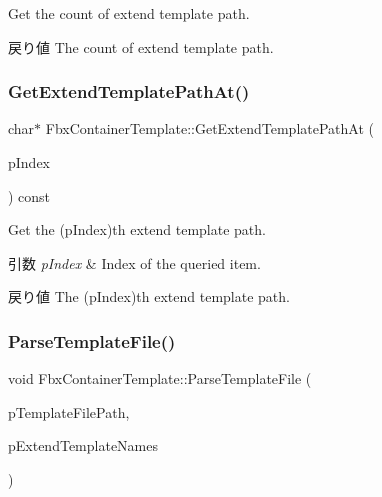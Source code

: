 Get the count of extend template path. \begin{DoxyReturn}{戻り値}
The count of extend template path. 
\end{DoxyReturn}
\mbox{\label{class_fbx_container_template_a09069044c9d47154b8981e592fd2b016}} 
\subsubsection{\texorpdfstring{Get\+Extend\+Template\+Path\+At()}{GetExtendTemplatePathAt()}}
{\footnotesize\ttfamily char$\ast$ Fbx\+Container\+Template\+::\+Get\+Extend\+Template\+Path\+At (\begin{DoxyParamCaption}\item[{\hyperlink{fbxtypes_8h_ae9fb141d8158a730aa85ec5ff2ea3f6b}{Fbx\+U\+Int}}]{p\+Index }\end{DoxyParamCaption}) const}

Get the (p\+Index)th extend template path. 
\begin{DoxyParams}{引数}
{\em p\+Index} & Index of the queried item. \\
\hline
\end{DoxyParams}
\begin{DoxyReturn}{戻り値}
The (p\+Index)th extend template path. 
\end{DoxyReturn}
\mbox{\label{class_fbx_container_template_ae12881e9350b8eea3598874208f06e18}} 
\subsubsection{\texorpdfstring{Parse\+Template\+File()}{ParseTemplateFile()}}
{\footnotesize\ttfamily void Fbx\+Container\+Template\+::\+Parse\+Template\+File (\begin{DoxyParamCaption}\item[{const char $\ast$}]{p\+Template\+File\+Path,  }\item[{\hyperlink{class_fbx_array}{Fbx\+Array}$<$ \hyperlink{class_fbx_string}{Fbx\+String} $\ast$$>$ \&}]{p\+Extend\+Template\+Names }\end{DoxyParamCaption})}


